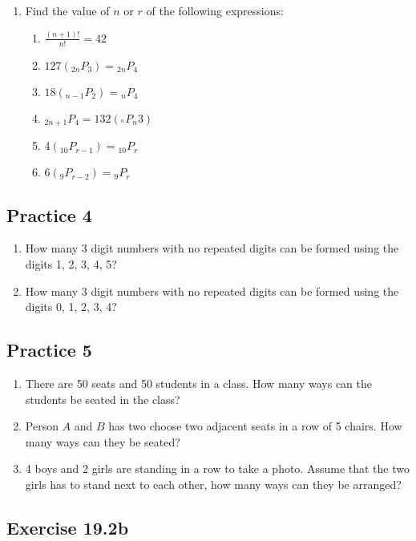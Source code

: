 \documentclass{report}
\newcommand\permtwo[2][^n]{{}_{#1}P_{#2}}
\begin{document}
\begin{multicols}{2}
\begin{enumerate}
    \item Find the value of $n$ or $r$ of the following expressions:
          \begin{enumerate}
            \item $\frac{(n+1)!}{n!} = 42$
            \item $127(\permtwo[2n]{3}) = \permtwo[2n]{4}$
            \item $18(\permtwo[n-1]{2}) = \permtwo[n]{4}$
            \item $\permtwo[2n+1]{4} = 132(\permtwo{n}{3})$
            \item $4(\permtwo[10]{r-1}) = \permtwo[10]{r}$
            \item $6(\permtwo[9]{r-2}) = \permtwo[9]{r}$
          \end{enumerate}
  \end{enumerate}

  \subsection{Practice 4}
  \begin{enumerate}
    \item How many 3 digit numbers with no repeated digits can be formed using the digits
          1, 2, 3, 4, 5?

    \item How many 3 digit numbers with no repeated digits can be formed using the digits
          0, 1, 2, 3, 4?
  \end{enumerate}

  \subsection{Practice 5}
  \begin{enumerate}
    \item There are 50 seats and 50 students in a class. How many ways can the students
          be seated in the class?

    \item Person $A$ and $B$ has two choose two adjacent seats in a row of 5 chairs. How
          many ways can they be seated?

    \item 4 boys and 2 girls are standing in a row to take a photo. Assume that the two girls has to stand next to each other, how many ways can they be arranged?
  \end{enumerate}

  \subsection{Exercise 19.2b}


\end{multicols}
\end{document}
